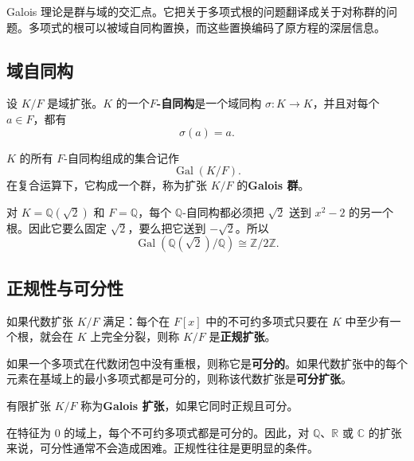 Galois 理论是群与域的交汇点。它把关于多项式根的问题翻译成关于对称群的问题。多项式的根可以被域自同构置换，而这些置换编码了原方程的深层信息。

\subsection{域自同构}

\begin{definition}[域自同构]
设 $K/F$ 是域扩张。$K$ 的一个\textbf{$F$-自同构}是一个域同构 $\sigma:K\to K$，并且对每个 $a\in F$，都有
\[
    \sigma(a)=a.
\]
\end{definition}

\begin{definition}[Galois 群]
$K$ 的所有 $F$-自同构组成的集合记作
\[
    \operatorname{Gal}(K/F).
\]
在复合运算下，它构成一个群，称为扩张 $K/F$ 的\textbf{Galois 群}。
\end{definition}

\begin{example}
对 $K=\mathbb{Q}(\sqrt{2})$ 和 $F=\mathbb{Q}$，每个 $\mathbb{Q}$-自同构都必须把 $\sqrt{2}$ 送到 $x^2-2$ 的另一个根。因此它要么固定 $\sqrt{2}$，要么把它送到 $-\sqrt{2}$。所以
\[
    \operatorname{Gal}(\mathbb{Q}(\sqrt{2})/\mathbb{Q})\cong \mathbb{Z}/2\mathbb{Z}.
\]
\end{example}

\subsection{正规性与可分性}

\begin{definition}[正规扩张]
如果代数扩张 $K/F$ 满足：每个在 $F[x]$ 中的不可约多项式只要在 $K$ 中至少有一个根，就会在 $K$ 上完全分裂，则称 $K/F$ 是\textbf{正规扩张}。
\end{definition}

\begin{definition}[可分多项式与可分扩张]
如果一个多项式在代数闭包中没有重根，则称它是\textbf{可分的}。如果代数扩张中的每个元素在基域上的最小多项式都是可分的，则称该代数扩张是\textbf{可分扩张}。
\end{definition}

\begin{definition}[Galois 扩张]
有限扩张 $K/F$ 称为\textbf{Galois 扩张}，如果它同时正规且可分。
\end{definition}

\begin{remark}
在特征为 $0$ 的域上，每个不可约多项式都是可分的。因此，对 $\mathbb{Q}$、$\mathbb{R}$ 或 $\mathbb{C}$ 的扩张来说，可分性通常不会造成困难。正规性往往是更明显的条件。
\end{remark}

